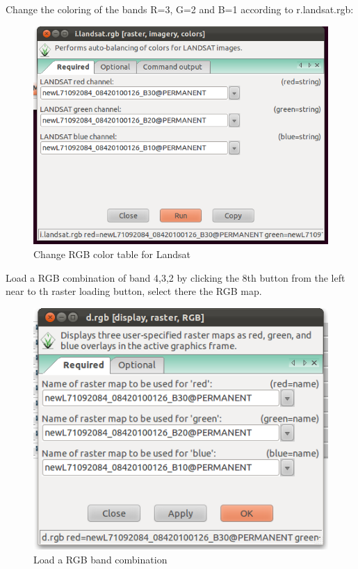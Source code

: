 Change the coloring of the bands R=3, G=2 and B=1 according to r.landsat.rgb:

\begin{figure}[htbp]
   \centering
   \includegraphics[scale=0.35]{grass_rs003.png}
   \caption{Change RGB color table for Landsat}
   \label{fig:grass_rs003}
\end{figure}

Load a RGB combination of band 4,3,2 by clicking the 8th button from the left near to th raster loading button, select there the RGB map.

\begin{figure}[htbp]
   \centering
   \includegraphics[scale=0.45]{grass_rs004.png}
   \caption{Load a RGB band combination}
   \label{fig:grass_rs004}
\end{figure}

